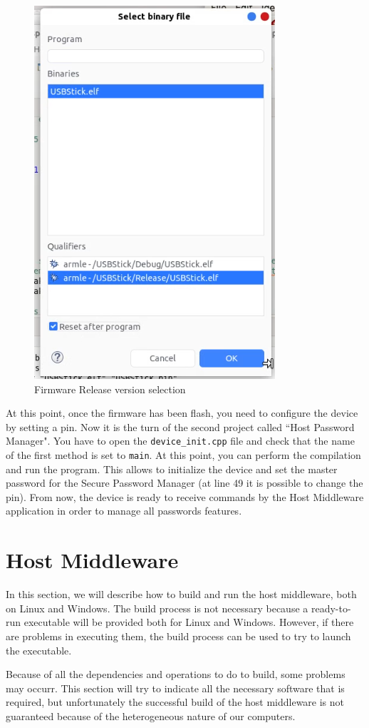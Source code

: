\begin{figure}[H]
	\centering
	\includegraphics[width=0.3\linewidth]{images/firmware/setup_12}
	\caption{Firmware Release version selection}
	\label{fig:setup12}
\end{figure}

At this point, once the firmware has been flash, you need to configure the device by setting a pin. Now it is the turn of the second project called ``Host Password Manager".\newline\newline
You have to open the \texttt{device\_init.cpp} file and check that the name of the first method is set to \texttt{main}. At this point, you can perform the compilation and run the program. This allows to initialize the device and set the master password for the Secure Password Manager (at line 49 it is possible to change the pin). From now, the device is ready to receive commands by the Host Middleware application in order to manage all passwords features.





\section{Host Middleware}

In this section, we will describe how to build and run the host middleware, both on Linux and Windows. The build process is not necessary because a ready-to-run executable will be provided both for Linux and Windows. However, if there are problems in executing them, the build process can be used to try to launch the executable.

\begin{warning}
	Because of all the dependencies and operations to do to build, some problems may occurr. This section will try to indicate all the necessary software that is required, but unfortunately the successful build of the host middleware is not guaranteed because of the heterogeneous nature of our computers.
\end{warning}

